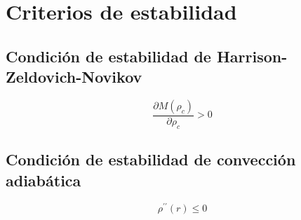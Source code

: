 \section{Criterios de estabilidad}

\subsection{Condición de estabilidad de Harrison-Zeldovich-Novikov}

\begin{equation}
    \frac { \partial M \left( \rho _ { c } \right) } { \partial \rho _ { c } } > 0
\end{equation}


\subsection{Condición de estabilidad de convección adiabática}

\begin{equation}
    \rho ^ { \prime \prime } ( r ) \leq 0
\end{equation}
